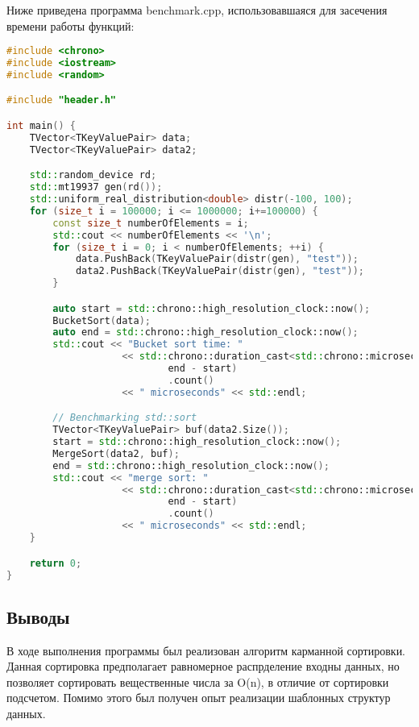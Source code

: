 \documentclass[12pt]{article}
\begin{document}
Ниже приведена программа benchmark.cpp, использовавшаяся для засечения времени работы функций:
\begin{lstlisting}[language=C++]
#include <chrono>
#include <iostream>
#include <random>

#include "header.h"

int main() {
    TVector<TKeyValuePair> data;
    TVector<TKeyValuePair> data2;

    std::random_device rd;
    std::mt19937 gen(rd());
    std::uniform_real_distribution<double> distr(-100, 100);
    for (size_t i = 100000; i <= 1000000; i+=100000) {
        const size_t numberOfElements = i;
        std::cout << numberOfElements << '\n';
        for (size_t i = 0; i < numberOfElements; ++i) {
            data.PushBack(TKeyValuePair(distr(gen), "test"));
            data2.PushBack(TKeyValuePair(distr(gen), "test"));
        }

        auto start = std::chrono::high_resolution_clock::now();
        BucketSort(data);
        auto end = std::chrono::high_resolution_clock::now();
        std::cout << "Bucket sort time: "
                    << std::chrono::duration_cast<std::chrono::microseconds>(
                            end - start)
                            .count()
                    << " microseconds" << std::endl;

        // Benchmarking std::sort
        TVector<TKeyValuePair> buf(data2.Size());
        start = std::chrono::high_resolution_clock::now();
        MergeSort(data2, buf);
        end = std::chrono::high_resolution_clock::now();
        std::cout << "merge sort: "
                    << std::chrono::duration_cast<std::chrono::microseconds>(
                            end - start)
                            .count()
                    << " microseconds" << std::endl;
    }

    return 0;
}

\end{lstlisting}

\subsection*{Выводы}

В ходе выполнения программы был реализован алгоритм карманной сортировки. Данная сортировка предполагает равномерное распрделение
входны данных, но позволяет сортировать вещественные числа за O(n), в отличие от сортировки подсчетом.
Помимо этого был получен опыт реализации шаблонных структур данных.
\end{document}
